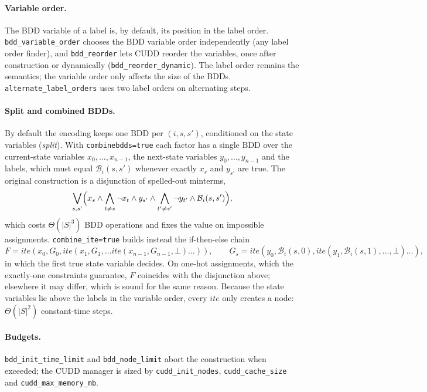 \documentclass[manuscript, screen]{jair}
\newcommand{\opt}[1]{\texttt{#1}}
\newcommand{\B}{\mathcal{B}}
\begin{document}
\paragraph{Variable order.} The BDD variable of a label is, by default, its position in the label
order. \opt{bdd\_variable\_order} chooses the BDD variable order independently (any label order
finder), and \opt{bdd\_reorder} lets CUDD \parencite{somenzi-cudd} reorder the variables, once after
construction or dynamically (\opt{bdd\_reorder\_dynamic}). The label order remains the semantics; the
variable order only affects the size of the BDDs. \opt{alternate\_label\_orders} uses two label orders
on alternating steps.

\paragraph{Split and combined BDDs.} By default the encoding keeps one BDD per $(i,s,s')$, conditioned
on the state variables (\emph{split}). With \opt{combinebdds=true} each factor has a single BDD over
the current-state variables $x_0,\dots,x_{n-1}$, the next-state variables $y_0,\dots,y_{n-1}$ and the
labels, which must equal $\B_i(s,s')$ whenever exactly $x_s$ and $y_{s'}$ are true. The original
construction is a disjunction of spelled-out minterms,
\[
  \bigvee_{s,s'} \Bigl( x_s \wedge \bigwedge_{t \neq s} \neg x_t \wedge y_{s'} \wedge \bigwedge_{t' \neq s'} \neg y_{t'} \wedge \B_i(s,s') \Bigr),
\]
which costs $\Theta(|S|^3)$ BDD operations and fixes the value on impossible assignments.
\opt{combine\_ite=true} builds instead the if-then-else chain
\[
  F = \mathit{ite}(x_0, G_0, \mathit{ite}(x_1, G_1, \dots \mathit{ite}(x_{n-1}, G_{n-1}, \bot)\dots)),
  \qquad
  G_s = \mathit{ite}(y_0, \B_i(s,0), \mathit{ite}(y_1, \B_i(s,1), \dots, \bot)\dots),
\]
in which the first true state variable decides. On one-hot assignments, which the exactly-one
constraints guarantee, $F$ coincides with the disjunction above; elsewhere it may differ, which is
sound for the same reason. Because the state variables lie above the labels in the variable order,
every $\mathit{ite}$ only creates a node: $\Theta(|S|^2)$ constant-time steps.

\paragraph{Budgets.} \opt{bdd\_init\_time\_limit} and \opt{bdd\_node\_limit} abort the construction
when exceeded; the CUDD manager is sized by \opt{cudd\_init\_nodes}, \opt{cudd\_cache\_size} and
\opt{cudd\_max\_memory\_mb}.
\end{document}
